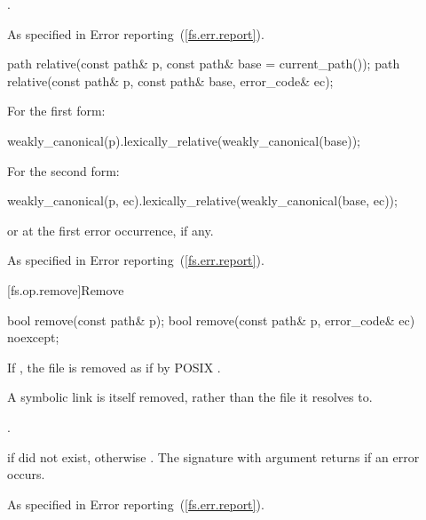 \begin{itemdescr}
\pnum
\returns {}.

\pnum
\throws As specified in Error reporting~(\ref{fs.err.report}).
\end{itemdescr}

%
\begin{itemdecl}
path relative(const path& p, const path& base = current_path());
path relative(const path& p, const path& base, error_code& ec);
\end{itemdecl}

\begin{itemdescr}
\pnum
\returns For the first form:
\begin{codeblock}
weakly_canonical(p).lexically_relative(weakly_canonical(base));
\end{codeblock}
  For the second form:
\begin{codeblock}
weakly_canonical(p, ec).lexically_relative(weakly_canonical(base, ec));
\end{codeblock}
  or  at the first error occurrence, if any.

\pnum
\throws As specified in Error reporting~(\ref{fs.err.report}).
\end{itemdescr}

[fs.op.remove]{Remove}

%
\begin{itemdecl}
bool remove(const path& p);
bool remove(const path& p, error_code& ec) noexcept;
\end{itemdecl}

\begin{itemdescr}
\pnum
\effects If , the file  is
  removed as if by POSIX .
\begin{note} A symbolic link is itself removed, rather than the file it
  resolves to. \end{note}

\pnum
\postcondition {}.

\pnum
\returns {} if  did not exist,
  otherwise . The signature with argument 
  returns  if an error occurs.

\pnum
\throws As specified in Error reporting~(\ref{fs.err.report}).
\end{itemdescr}


